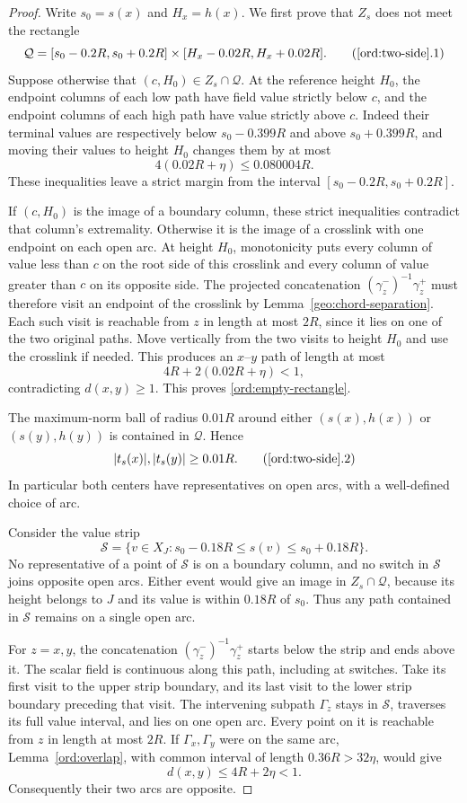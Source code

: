 \begin{proof}
Write $s_0=s(x)$ and $H_x=h(x)$. We first prove that $Z_s$
does not meet the rectangle
\[
 \mathcal Q=
 [s_0-0.2R,s_0+0.2R]\times
 [H_x-0.02R,H_x+0.02R].
\tag{\ref{ord:two-side}.1}\label{ord:empty-rectangle}
\]
Suppose otherwise that $(c,H_0)\in Z_s\cap\mathcal Q$.
At the reference height $H_0$, the endpoint columns of
each low path have field value strictly below $c$, and
the endpoint columns of each high path have value strictly
above $c$. Indeed their terminal values are respectively
below $s_0-0.399R$ and above $s_0+0.399R$, and moving
their values to height $H_0$ changes them by at most
\[
 4(0.02R+\eta)\le0.080004R.
\]
These inequalities leave a strict margin from the interval
$[s_0-0.2R,s_0+0.2R]$.

If $(c,H_0)$ is the image of a boundary column, these
strict inequalities contradict that column's extremality.
Otherwise it is the image of a crosslink with one endpoint
on each open arc. At height $H_0$, monotonicity puts every
column of value less than $c$ on the root side of this
crosslink and every column of value greater than $c$ on
its opposite side. The projected concatenation
$(\gamma_z^-)^{-1}\gamma_z^+$ must therefore visit an
endpoint of the crosslink by
Lemma~\ref{geo:chord-separation}. Each such visit is
reachable from $z$ in length at most $2R$, since it lies
on one of the two original paths. Move vertically from
the two visits to height $H_0$ and use the crosslink if
needed. This produces an $x$--$y$ path of length at most
\[
 4R+2(0.02R+\eta)<1,
\]
contradicting $d(x,y)\ge1$. This proves
\eqref{ord:empty-rectangle}.

The maximum-norm ball of radius $0.01R$ around either
$(s(x),h(x))$ or $(s(y),h(y))$ is contained in
$\mathcal Q$. Hence
\[
 |t_s(x)|,|t_s(y)|\ge0.01R.
\tag{\ref{ord:two-side}.2}\label{ord:positive-magnitude}
\]
In particular both centers have representatives on open
arcs, with a well-defined choice of arc.

Consider the value strip
\[
 \mathcal S=\{v\in X_J: s_0-0.18R\le s(v)
                                      \le s_0+0.18R\}.
\]
No representative of a point of $\mathcal S$ is on a
boundary column, and no switch in $\mathcal S$ joins
opposite open arcs. Either event would give an image in
$Z_s\cap\mathcal Q$, because its height belongs to $J$
and its value is within $0.18R$ of $s_0$. Thus any path
contained in $\mathcal S$ remains on a single open arc.

For $z=x,y$, the concatenation
$(\gamma_z^-)^{-1}\gamma_z^+$ starts below the strip
and ends above it. The scalar field is continuous along
this path, including at switches. Take its first visit
to the upper strip boundary, and its last visit to the
lower strip boundary preceding that visit. The intervening
subpath $\Gamma_z$ stays in $\mathcal S$, traverses its
full value interval, and lies on one open arc. Every
point on it is reachable from $z$ in length at most $2R$.
If $\Gamma_x,\Gamma_y$ were on the same arc,
Lemma~\ref{ord:overlap}, with common interval of length
$0.36R>32\eta$, would give
\[
 d(x,y)\le4R+2\eta<1.
\]
Consequently their two arcs are opposite.


\end{proof}
